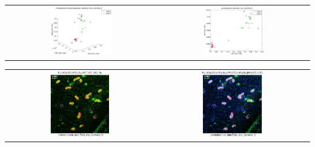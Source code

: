 \documentclass[12pt,a4paper]{article}
\begin{document}
\begin{center}
\begin{tabular}{cc}
\end{tabular}
\begin{tabular}{cc}
\includegraphics[width=0.42\textwidth]{pdf/13C-(12C+13C)-vs-19F-(12C+13C)-vs-32S-(12C+13C)} & \includegraphics[width=0.42\textwidth]{pdf/13C-(12C+13C)-vs-19F-(12C+13C)} \\
\end{tabular}
\begin{tabular}{cc}
\includegraphics[width=0.42\textwidth]{pdf/13C-12C+13C-vs-19F-12C+13C-rgb} & \includegraphics[width=0.42\textwidth]{pdf/13C-12C+13C-vs-19F-12C+13C-vs-32S-12C+13C-rgb} \\
\end{tabular}
\end{center}
\end{document}
